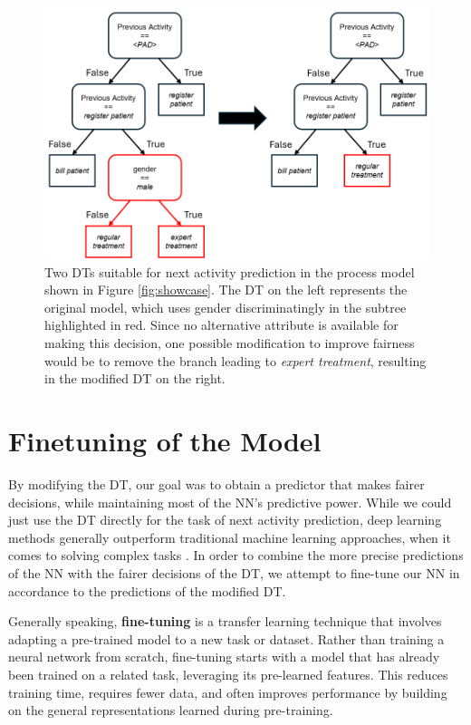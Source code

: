 \begin{figure}[h!]
    \centering
    \includegraphics[width=\textwidth]{gfx/modification.png}
    \caption{Two DTs suitable for next activity prediction in the process model shown in Figure \ref{fig:showcase}.
    The DT on the left represents the original model, which uses gender discriminatingly in the subtree highlighted in red.
    Since no alternative attribute is available for making this decision,
    one possible modification to improve fairness would be to remove the branch leading to \textit{expert treatment},
    resulting in the modified DT on the right.
    }
    \label{fig:modification}
\end{figure}

\section{Finetuning of the Model}
By modifying the DT, our goal was to obtain a predictor that 
makes fairer decisions, while maintaining most of the NN's predictive power.
While we could just use the DT directly for the task of next activity prediction,
deep learning methods generally outperform traditional machine learning approaches,
when it comes to solving complex tasks \cite{ml_comparison}.
In order to combine the more precise predictions of the NN with the fairer decisions of the DT,
we attempt to fine-tune our NN in accordance to the predictions of the modified DT.

Generally speaking, \textbf{fine-tuning} \cite{fine_tuning} is a transfer learning technique
that involves adapting a pre-trained model to a new task or dataset.
Rather than training a neural network from scratch,
fine-tuning starts with a model that has already been trained on a related task,
leveraging its pre-learned features.
This reduces training time, requires fewer data, and often improves performance
by building on the general representations learned during pre-training.

